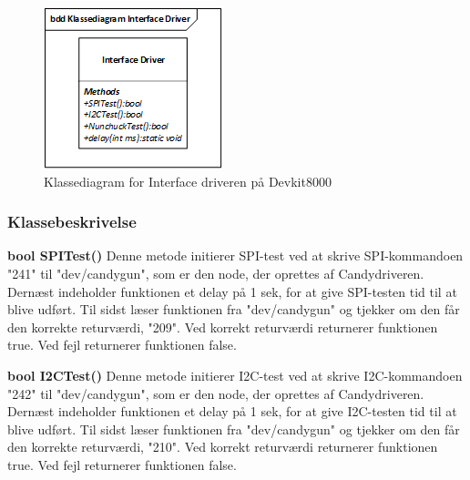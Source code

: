 \begin{figure}[H]
	\centering
	\includegraphics[width=\textwidth]{DesignOgImplementering/images/InterfacedriverKlassediagram}
	\caption{Klassediagram for Interface driveren på Devkit8000}
	\label{fig:InterfacedriverKlassediagram}
\end{figure}

\subsubsection{Klassebeskrivelse}

\textbf{bool SPITest()}
Denne metode initierer SPI-test ved at skrive SPI-kommandoen "241" til "dev/candygun", som er den node, der oprettes af Candydriveren. Dernæst indeholder funktionen et delay på 1 sek, for at give SPI-testen tid til at blive udført. Til sidst læser funktionen fra "dev/candygun" og tjekker om den får den korrekte returværdi, "209". Ved korrekt returværdi returnerer funktionen true. Ved fejl returnerer funktionen false.      
                                                  
\textbf{bool I2CTest()}
Denne metode initierer I2C-test ved at skrive I2C-kommandoen "242" til "dev/candygun", som er den node, der oprettes af Candydriveren. Dernæst indeholder funktionen et delay på 1 sek, for at give I2C-testen tid til at blive udført. Til sidst læser funktionen fra "dev/candygun" og tjekker om den får den korrekte returværdi, "210". Ved korrekt returværdi returnerer funktionen true. Ved fejl returnerer funktionen false.
                                                     
